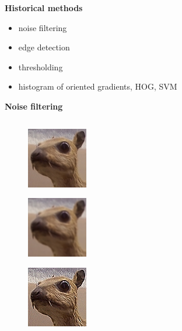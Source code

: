 \documentclass[xcolor=dvipsnames]{beamer}
\begin{document}
\begin{frame}{\bf Historical methods}

    \begin{itemize}
        \item noise filtering
        \item edge detection
        \item thresholding
        \item histogram of oriented gradients, HOG, SVM
    \end{itemize}

\end{frame}

\begin{frame}{\bf Noise filtering}

\begin{columns}
\begin{column}{0.5\textwidth}

  \begin{figure}[!htb]
    \centering
    \includegraphics[scale=1.1]{../../pictures/image_processing/orig.png}
  \end{figure}

  \begin{figure}[!htb]
    \centering
    \includegraphics[scale=1.1]{../../pictures/image_processing/blur.png}
  \end{figure}

  \begin{figure}[!htb]
    \centering
    \includegraphics[scale=1.1]{../../pictures/image_processing/sharping.png}
  \end{figure}


\end{column}
\end{columns}
\end{frame}
\end{document}
